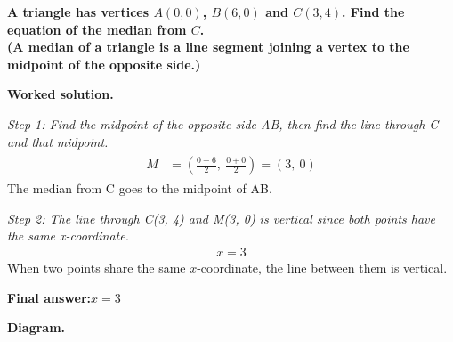 \documentclass[11pt]{article}
\newcommand{\question}[1]{\par\medskip\noindent\textbf{#1}\par}
\begin{document}
\question{A triangle has vertices \( A(0, 0) \), \( B(6, 0) \) and \( C(3, 4) \). Find the equation of the median from \( C \). \\[3pt] (A median of a triangle is a line segment joining a vertex to the midpoint of the opposite side.)}

\textbf{Worked solution.}

\textit{Step 1: Find the midpoint of the opposite side AB, then find the line through C and that midpoint.}
\[\begin{gathered}
\begin{aligned} M &= \left(\frac{0+6}{2},\ \frac{0+0}{2}\right) = (3,\ 0) \end{aligned}
\end{gathered}\]
The median from C goes to the midpoint of AB.

\textit{Step 2: The line through C(3, 4) and M(3, 0) is vertical since both points have the same x-coordinate.}
\[\begin{gathered}
x = 3
\end{gathered}\]
When two points share the same \(x\)-coordinate, the line between them is vertical.

\begin{answerbox}
\textbf{Final answer:}\quad \(\displaystyle x = 3\)
\end{answerbox}
\textbf{Diagram.}
\end{document}
